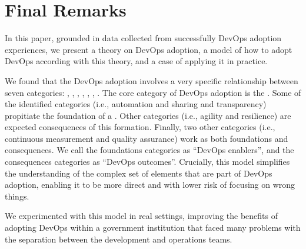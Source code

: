 \section{Final Remarks} \label{sec:conclusion}

In this paper, grounded in data collected from successfully DevOps adoption
experiences, we present a theory on DevOps adoption, a model of how to adopt
DevOps according with this theory, and a case of applying it in practice.

We found that the DevOps adoption involves a very specific relationship between
seven categories: , , \cc, , , , .
The core category of DevOps adoption is the \cc. Some of the
identified categories (i.e., automation and sharing and transparency) propitiate
the foundation of a \cc. Other categories
(i.e., agility and resilience) are expected consequences of this formation.
Finally, two other categories (i.e., continuous measurement and quality
assurance) work as both foundations and consequences. We call the foundations
categories as ``DevOps enablers'', and the consequences categories as ``DevOps outcomes''.
Crucially, this model simplifies the understanding of the
complex set of elements that are part of DevOps adoption, enabling it to be
more direct and with lower risk of focusing on wrong things. 

We experimented with 
this model in real settings, improving the benefits of adopting DevOps 
within a government institution that faced many problems with the separation between the 
development and operations teams. 


